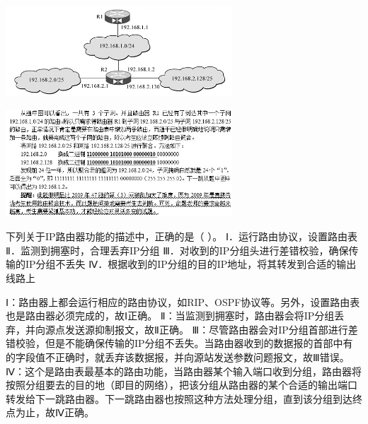 \includegraphics[width=3.33333in,height=1.33333in]{computerassets/68bb6dada2bc1a91fdc323c08ef13460.jpeg}
\par{}
\begin{solution}\includegraphics[width=3.33333in,height=1.58333in]{computerassets/587e0809d07702794990cae26f6745b2.jpeg}
\end{solution}
\question 下列关于IP路由器功能的描述中，正确的是（ ）。
Ⅰ．运行路由协议，设置路由表 Ⅱ．监测到拥塞时，合理丢弃IP分组
Ⅲ．对收到的IP分组头进行差错校验，确保传输的IP分组不丢失
Ⅳ．根据收到的IP分组的目的IP地址，将其转发到合适的输出线路上
\par{}
\begin{solution}Ⅰ：路由器上都会运行相应的路由协议，如RIP、OSPF协议等。另外，设置路由表也是路由器必须完成的，故Ⅰ正确。
Ⅱ：当监测到拥塞时，路由器会将IP分组丢弃，并向源点发送源抑制报文，故Ⅱ正确。
Ⅲ：尽管路由器会对IP分组首部进行差错校验，但是不能确保传输的IP分组不丢失。当路由器收到的数据报的首部中有的字段值不正确时，就丢弃该数据报，并向源站发送参数问题报文，故Ⅲ错误。
Ⅳ：这个是路由表最基本的路由功能，当路由器某个输入端口收到分组，路由器将按照分组要去的目的地（即目的网络），把该分组从路由器的某个合适的输出端口转发给下一跳路由器。下一跳路由器也按照这种方法处理分组，直到该分组到达终点为止，故Ⅳ正确。
\end{solution}
